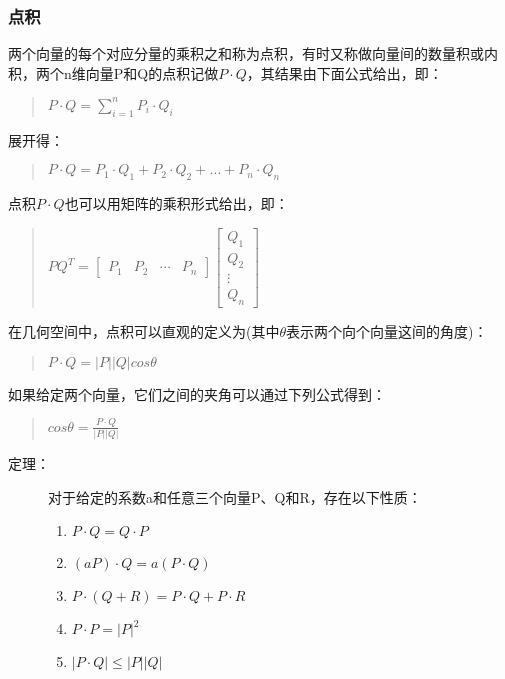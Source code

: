 \documentclass[a4paper,10pt]{article}
\begin{document}
\begin{CJK}{UTF8}{song}
\subsubsection{点积}
两个向量的每个对应分量的乘积之和称为点积，有时又称做向量间的数量积或内积，两个n维向量P和Q的点积记做$P\cdot{}Q$，其结果由下面公式给出，即：
\begin{quote}
$P\cdot{}Q=\sum_{i=1}^{n}P_{i}\cdot{}Q_{i}
$
\end{quote}
展开得：
\begin{quote}
$P\cdot{}Q=P_{1}\cdot{}Q_{1}+P_{2}\cdot{}Q_{2}+\ldots{}+P_{n}\cdot{}Q_{n}$
\end{quote}
点积$P\cdot{}Q$也可以用矩阵的乘积形式给出，即：
\begin{quote}
$PQ^{T}=\left[
\begin{array}{cccc}
 P_{1} & P_{2} &  \cdots{} & P_{n} 
\end{array}\right]
\left[
\begin{array}{c}
Q_{1} \\
Q_{2} \\
\vdots{} \\
Q_{n}
\end{array}\right]
$
\end{quote}
在几何空间中，点积可以直观的定义为(其中$\theta$表示两个向个向量这间的角度)：
\begin{quote}
 $P\cdot{}Q=|P||Q|cos\theta $
\end{quote}
如果给定两个向量，它们之间的夹角可以通过下列公式得到：
\begin{quote}
$cos\theta=\frac{P\cdot{}Q}{|P||Q|}$
\end{quote}
\begin{description}
\item[定理：]对于给定的系数a和任意三个向量P、Q和R，存在以下性质：
\begin{enumerate}
\item $P\cdot{}Q=Q\cdot{}P$
\item $(aP)\cdot{}Q=a(P\cdot{}Q)$
\item $P\cdot{}(Q+R)=P\cdot{}Q+P\cdot{}R$
\item $P\cdot{}P=|P|^2 $
\item $|P\cdot{}Q|\le{}|P||Q|$
\end{enumerate}

\end{description}

\end{CJK}
\end{document}
